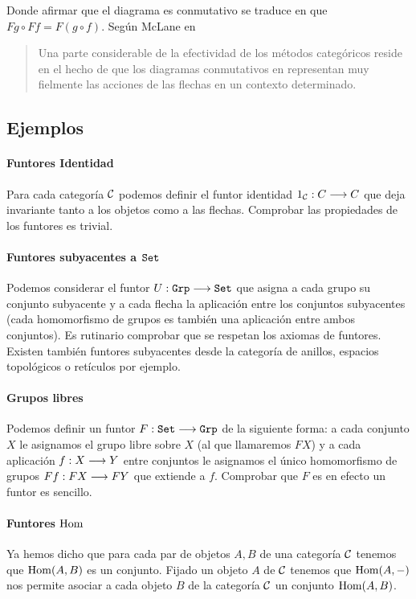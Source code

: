 Donde afirmar que el diagrama es conmutativo se traduce en
que $F g \circ F f = F (g\circ f)$. Según McLane en \cite{mclane}

\begin{quotation}
  Una parte considerable de la efectividad de los métodos
  categóricos reside en el hecho de que los diagramas
  conmutativos en representan muy fielmente las acciones de
  las flechas en un contexto determinado.
\end{quotation}


\subsection{Ejemplos}
\paragraph{Funtores Identidad}
Para cada categoría $\mathcal{C}$ podemos definir el funtor identidad
$1_{\mathcal{C}} : C\longrightarrow C$ que deja invariante tanto a los objetos
como a las flechas. Comprobar las propiedades de los funtores
es trivial.

\paragraph{Funtores subyacentes a $\texttt{Set}$}
Podemos considerar el funtor $U : \texttt{Grp}\longrightarrow \texttt{Set}$
que asigna a cada grupo su conjunto subyacente y a cada flecha la
aplicación entre los conjuntos subyacentes (cada homomorfismo de
grupos es también una aplicación entre ambos conjuntos). Es rutinario
comprobar que se respetan los axiomas de funtores. Existen también
funtores subyacentes desde la categoría de anillos, espacios topológicos
o retículos por ejemplo.

\paragraph{Grupos libres}
Podemos definir un funtor $F : \texttt{Set}\longrightarrow \texttt{Grp}$ de la siguiente
forma: a cada conjunto $X$ le asignamos el grupo libre sobre $X$
(al que llamaremos $F X$) y a
cada aplicación $f : X\longrightarrow Y$ entre conjuntos le asignamos el
único homomorfismo de grupos $F f: F X\longrightarrow F Y$ que extiende a $f$.
Comprobar que
$F$ es en efecto un funtor es sencillo.

\paragraph{Funtores $\operatorname{Hom}$}
Ya hemos dicho que para cada par de objetos $A, B$ de
una categoría $\mathcal{C}$ tenemos que
$\operatorname{Hom}(A, B)$ es un conjunto. Fijado un objeto $A$ de
$\mathcal{C}$ tenemos que $\operatorname{Hom}(A, -)$ nos permite asociar a cada
objeto $B$ de la categoría $\mathcal{C}$ un conjunto $\operatorname{Hom}(A, B)$.

